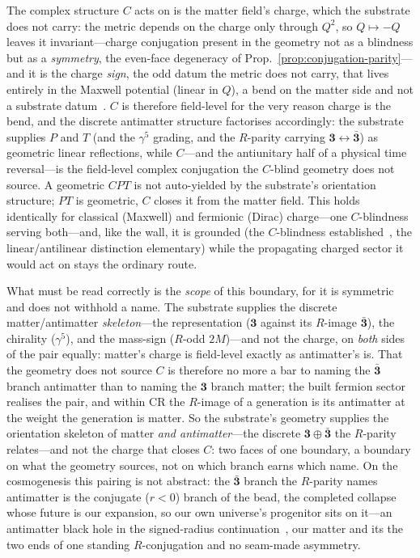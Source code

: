 \documentclass[11pt]{article}
\theoremstyle{plain}
\theoremstyle{remark}
\begin{document}
The complex structure $C$ acts on is the matter field's charge, which the substrate does not carry: the metric depends on the charge only through $Q^2$, so $Q\mapsto-Q$ leaves it invariant---charge conjugation present in the geometry not as a blindness but as a \emph{symmetry}, the even-face degeneracy of Prop.~\ref{prop:conjugation-parity}---and it is the charge \emph{sign}, the odd datum the metric does not carry, that lives entirely in the Maxwell potential (linear in $Q$), a bend on the matter side and not a substrate datum~\cite{JanzenRange}. $C$ is therefore field-level for the very reason charge is the bend, and the discrete antimatter structure factorises accordingly: the substrate supplies $P$ and $T$ (and the $\gamma^5$ grading, and the $R$-parity carrying $\mathbf 3\leftrightarrow\bar{\mathbf 3}$) as geometric linear reflections, while $C$---and the antiunitary half of a physical time reversal---is the field-level complex conjugation the $C$-blind geometry does not source. A geometric $CPT$ is not auto-yielded by the substrate's orientation structure; $PT$ is geometric, $C$ closes it from the matter field. This holds identically for classical (Maxwell) and fermionic (Dirac) charge---one $C$-blindness serving both---and, like the wall, it is grounded (the $C$-blindness established~\cite{JanzenRange}, the linear/antilinear distinction elementary) while the propagating charged sector it would act on stays the ordinary route. 

What must be read correctly is the \emph{scope} of this boundary, for it is symmetric and does not withhold a name. The substrate supplies the discrete matter/antimatter \emph{skeleton}---the representation ($\mathbf 3$ against its $R$-image $\bar{\mathbf 3}$), the chirality ($\gamma^5$), and the mass-sign ($R$-odd $2M$)---and not the charge, on \emph{both} sides of the pair equally: matter's charge is field-level exactly as antimatter's is. That the geometry does not source $C$ is therefore no more a bar to naming the $\bar{\mathbf 3}$ branch antimatter than to naming the $\mathbf 3$ branch matter; the built fermion sector~\cite{JanzenMatter} realises the pair, and within CR the $R$-image of a generation is its antimatter at the weight the generation is matter. So the substrate's geometry supplies the orientation skeleton of matter \emph{and antimatter}---the discrete $\mathbf 3\oplus\bar{\mathbf 3}$ the $R$-parity relates---and not the charge that closes $C$: two faces of one boundary, a boundary on what the geometry sources, not on which branch earns which name. On the cosmogenesis this pairing is not abstract: the $\bar{\mathbf 3}$ branch the $R$-parity names antimatter is the conjugate ($r<0$) branch of the bead, the completed collapse whose future is our expansion, so our own universe's progenitor sits on it---an antimatter black hole in the signed-radius continuation~\cite{JanzenCRframework}, our matter and its the two ends of one standing $R$-conjugation and no seam-made asymmetry.
\end{document}
